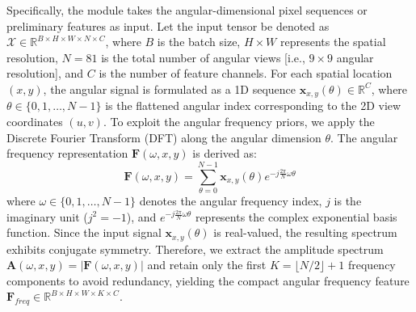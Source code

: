 \documentclass[lettersize,journal]{IEEEtran}
\begin{document}
Specifically, the module takes the angular-dimensional pixel sequences or preliminary features as input. Let the input tensor be denoted as $\mathcal{X} \in \mathbb{R}^{B \times H \times W \times N \times C}$, where $B$ is the batch size, $H \times W$ represents the spatial resolution, $N = 81$ is the total number of angular views  [i.e., $9 \times 9$ angular resolution], and $C$ is the number of feature channels. For each spatial location $(x, y)$, the angular signal is formulated as a 1D sequence $\mathbf{x}_{x,y}(\theta) \in \mathbb{R}^C$, where $\theta \in \{0, 1, \dots, N-1\}$ is the flattened angular index corresponding to the 2D view coordinates $(u, v)$. To exploit the angular frequency priors, we apply the Discrete Fourier Transform (DFT) along the angular dimension $\theta$. The angular frequency representation $\mathbf{F}(\omega, x, y)$ is derived as:
\begin{equation}
\label{eq:eq7}
\mathbf{F}(\omega, x, y) = \sum_{\theta=0}^{N-1} \mathbf{x}_{x,y}(\theta) e^{-j \frac{2\pi}{N} \omega \theta}
\end{equation}
where $\omega \in \{0, 1, \dots, N-1\}$ denotes the angular frequency index, $j$ is the imaginary unit ($j^2 = -1$), and $e^{-j \frac{2\pi}{N} \omega \theta}$ represents the complex exponential basis function. Since the input signal $\mathbf{x}_{x,y}(\theta)$ is real-valued, the resulting spectrum exhibits conjugate symmetry. Therefore, we extract the amplitude spectrum $\mathbf{A}(\omega, x, y) = |\mathbf{F}(\omega, x, y)|$ and retain only the first $K = \lfloor N/2 \rfloor + 1$ frequency components to avoid redundancy, yielding the compact angular frequency feature $\mathbf{F}_{freq} \in \mathbb{R}^{B \times H \times W \times K \times C}$.
\end{document}

